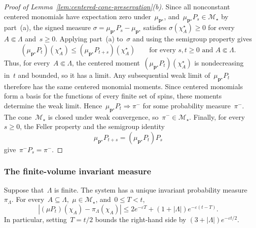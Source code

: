 \documentclass[EJP,preprint,NODS,nobera]{ejpecp}
\newcommand{\bb}[1]{\left(#1\right)}
\newcommand{\abs}[1]{\left|#1\right|}
\newcommand{\mb}[1]{\mathbf{#1}}
\newcommand{\rev}[1]{{\color{red}#1}}
\begin{document}
\begin{proof}[Proof of Lemma~\ref{lem:centered-cone-preservation}\textup{(b)}]
Since all nonconstant centered monomials have expectation zero
under~$\mu_{\mb p^\star}$, and~$\mu_{\mb p^\star}P_s\in\mathcal M_\star$ by
part~\textup{(a)}, the signed measure
$\sigma=\mu_{\mb p^\star}P_s-\mu_{\mb p^\star}$ satisfies
$\sigma(\chi_A^\star)\geq0$ for every~$A\Subset\Lambda$ and~$s\geq0$.
Applying part~\textup{(a)} to~$\sigma$ and using the
semigroup property gives
\begin{equation*}
(\mu_{\mb p^\star}P_t)(\chi_A^\star)
\leq
(\mu_{\mb p^\star}P_{t+s})(\chi_A^\star)
\qquad
\text{for every }s,t\geq0\text{ and }A\Subset\Lambda.
\end{equation*}
Thus, for every~$A\Subset\Lambda$, the centered moment~$(\mu_{\mb p^\star}P_t)(\chi_A^\star)$ is nondecreasing in~$t$ and bounded,
so it has a limit. Any subsequential weak limit of~$\mu_{\mb p^\star}P_t$ therefore has the same centered monomial moments.
Since centered monomials form a basis for the functions of every finite set of
spins, these moments determine the weak limit. Hence~$\mu_{\mb p^\star}P_t\Rightarrow\pi^-$ for some probability measure~$\pi^-$. The cone~$\mathcal M_\star$ is closed under weak convergence, so~$\pi^-\in\mathcal M_\star$. Finally, for every~$s\geq0$, the Feller
property and the semigroup identity
\begin{equation*}
\mu_{\mb p^\star}P_{t+s}
=
\bb{\mu_{\mb p^\star}P_t}P_s
\end{equation*}
give~$\pi^-P_s=\pi^-$.
\end{proof}

\subsubsection{\texorpdfstring{\rev{The finite-volume invariant measure}}{The finite-volume invariant measure}}
\label{subsec:finite-volume-convergence}

{\color{red}
\begin{proposition}
\label{prop:finite-volume-convergence}
Suppose that~$\Lambda$ is finite. The system has a unique invariant probability measure~$\pi_\Lambda$.
For every~$A\subseteq\Lambda$,~$\mu\in\mathcal M_\star$, and~$0\leq T<t$,
\begin{equation}
\abs{(\mu P_t)(\chi_A)-\pi_\Lambda(\chi_A)}
\leq 2e^{-\varepsilon T}
 +(1+\abs\Lambda)e^{-\varepsilon(t-T)}.
\label{eq:finite-volume-convergence}
\end{equation}
In particular, setting~$T=t/2$ bounds the right-hand side by
$(3+\abs\Lambda)e^{-\varepsilon t/2}$.
\end{proposition}
}
\end{document}

